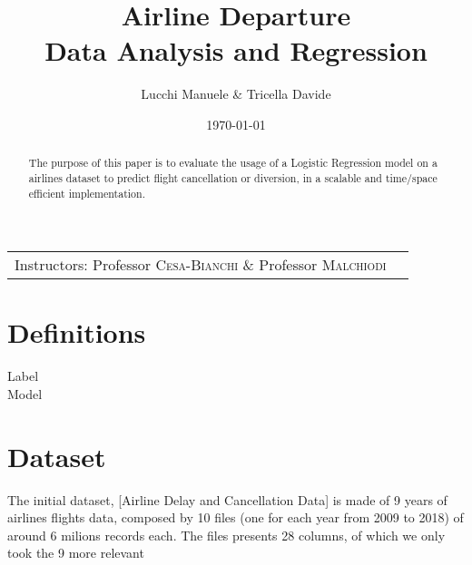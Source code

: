 \documentclass[
	letterpaper, %
	10pt, %
]{class}
\title{Airline Departure\\Data Analysis and Regression} %
\author{Lucchi Manuele \& Tricella Davide} %
\date{\today} %
\begin{document}
\maketitle %

\begin{center}
	\begin{tabular}{l r}
		Instructors: Professor \textsc{Cesa-Bianchi} \& Professor \textsc{Malchiodi}
	\end{tabular}
\end{center}


\begin{abstract}
	The purpose of this paper is to evaluate the usage of a Logistic Regression model on a airlines dataset to predict flight cancellation or diversion, in a scalable and time/space efficient implementation.
\end{abstract}

\section{Definitions}\label{definitions} %

\begin{description}
	\item[Label]
	\item[Model]
\end{description}


\section{Dataset}

The initial dataset, [Airline Delay and Cancellation Data] is made of 9 years of airlines flights data, composed by 10 files (one for each year from 2009 to 2018) of around 6 milions records each.
The files presents 28 columns, of which we only took the 9 more relevant\\
\end{document}
